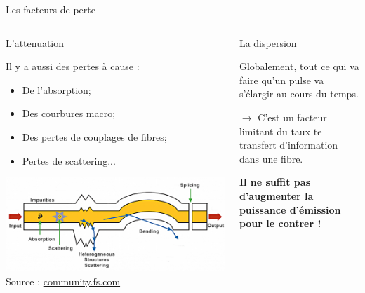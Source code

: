 \documentclass[aspectratio=149, 10pt, t]{beamer}
\begin{document}
\begin{frame}{Les facteurs de perte}
    \begin{columns}
        \begin{column}{0.5\linewidth}
        \medskip
        \alert{L'attenuation}
            
            Il y a aussi des pertes à cause :\begin{itemize}
                \item De l'absorption;
                \item Des courbures macro;
                \item Des pertes de couplages de fibres;
                \item Pertes de scattering...
            \end{itemize}
            \includegraphics[width=\linewidth]{images/different-types-of-losses-in-optical-fiber.png}
            {\footnotesize Source : \href{https://community.fs.com/fr/blog/how-to-reduce-various-types-of-losses-in-optical-fiber.html}{community.fs.com}}

        \end{column}
        \begin{column}{0.5\linewidth}
        \medskip
        \alert{La dispersion}

            Globalement, tout ce qui va faire qu'un pulse va s'élargir au cours du temps.

            
            $\longrightarrow$ C'est un facteur limitant du taux te transfert d'information dans une fibre. 

            \textbf{Il ne suffit pas d'augmenter la puissance d'émission pour le contrer !}
        \end{column}
    \end{columns}
\end{frame}
\end{document}
